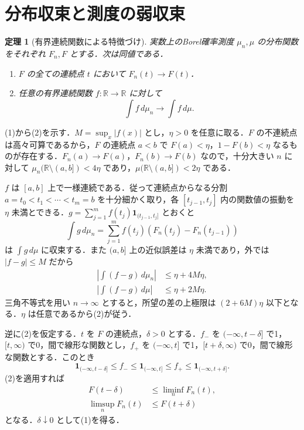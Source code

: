 \documentclass[a5paper,10pt,onecolumn]{jsarticle}
\makeatletter
\theoremstyle{mathnotetheorem}
\newtheorem{theorem}{定理}[section]
\renewcommand{\proofname}{証明}
\renewenvironment{proof}[1][\proofname]{%
  \par\pushQED{\qed}\normalfont\topsep4\p@\@plus2\p@\relax
  \trivlist\item[\hskip\labelsep\bfseries #1]\ignorespaces
}{\popQED\endtrivlist\@endpefalse}
\newcommand{\R}{\mathbb{R}}
\newcommand{\1}{\mathbf{1}}
\makeatother
\begin{document}
\section{分布収束と測度の弱収束}
\begin{theorem}[有界連続関数による特徴づけ]\label{weak}
実数上のBorel確率測度 $\mu_n,\mu$ の分布関数をそれぞれ $F_n,F$ とする．次は同値である．
\begin{enumerate}
\item $F$ の全ての連続点 $t$ において $F_n(t)\to F(t)$．
\item 任意の有界連続関数 $f:\R\to\R$ に対して
\[
 \int f\,d\mu_n\longrightarrow\int f\,d\mu.
\]
\end{enumerate}
\end{theorem}
\begin{proof}
(1)から(2)を示す．$M=\sup_x|f(x)|$ とし，$\eta>0$ を任意に取る．$F$ の不連続点は高々可算であるから，$F$ の連続点 $a<b$ で $F(a)<\eta$，$1-F(b)<\eta$ なるものが存在する．$F_n(a)\to F(a)$，$F_n(b)\to F(b)$ なので，十分大きい $n$ に対して $\mu_n(\R\setminus(a,b])<4\eta$ であり，$\mu(\R\setminus(a,b])<2\eta$ である．

$f$ は $[a,b]$ 上で一様連続である．従って連続点からなる分割 $a=t_0<t_1<\cdots<t_m=b$ を十分細かく取り，各 $[t_{j-1},t_j]$ 内の関数値の振動を $\eta$ 未満とできる．$g=\sum_{j=1}^m f(t_j)\1_{(t_{j-1},t_j]}$ とおくと
\[
 \int g\,d\mu_n=\sum_{j=1}^m f(t_j)(F_n(t_j)-F_n(t_{j-1}))
\]
は $\int g\,d\mu$ に収束する．また $(a,b]$ 上の近似誤差は $\eta$ 未満であり，外では $|f-g|\le M$ だから
\begin{align*}
 \left|\int (f-g)\,d\mu_n\right|&\le\eta+4M\eta,\\
 \left|\int (f-g)\,d\mu\right|&\le\eta+2M\eta.
\end{align*}
三角不等式を用い $n\to\infty$ とすると，所望の差の上極限は $(2+6M)\eta$ 以下となる．$\eta$ は任意であるから(2)が従う．

逆に(2)を仮定する．$t$ を $F$ の連続点，$\delta>0$ とする．$f_-$ を $(-\infty,t-\delta]$ で1，$[t,\infty)$ で0，間で線形な関数とし，$f_+$ を $(-\infty,t]$ で1，$[t+\delta,\infty)$ で0，間で線形な関数とする．このとき
\[
 \1_{(-\infty,t-\delta]}\le f_-\le\1_{(-\infty,t]}
 \le f_+\le\1_{(-\infty,t+\delta]}.
\]
(2)を適用すれば
\begin{align*}
 F(t-\delta)&\le\liminf_n F_n(t),\\
 \limsup_n F_n(t)&\le F(t+\delta)
\end{align*}
となる．$\delta\downarrow0$ として(1)を得る．
\end{proof}
\end{document}
